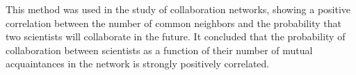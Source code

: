 This method was used  \cite{newman2001clustering} in the study of collaboration networks, showing a positive correlation between the number of common neighbors and the probability that two scientists will collaborate in the future.  It concluded that the probability of collaboration between scientists as a function of their number of mutual acquaintances in the network is strongly positively correlated.